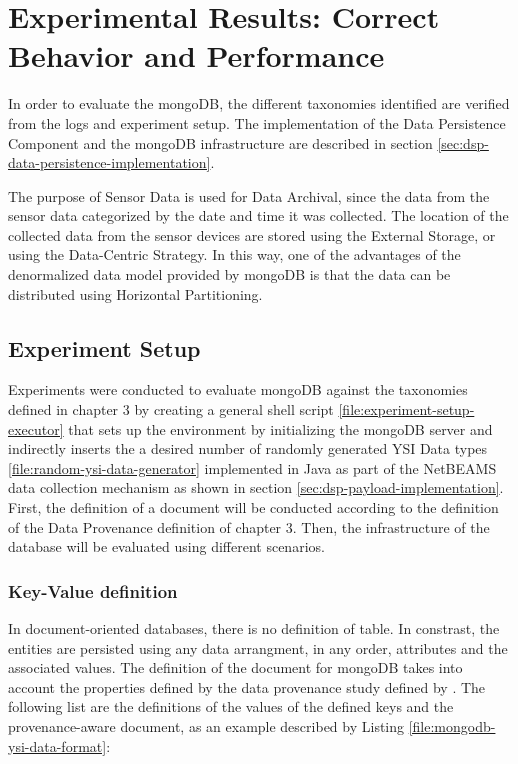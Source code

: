 

\chapter{Experimental Results: Correct Behavior and Performance}

In order to evaluate the mongoDB, the different taxonomies identified are
verified from the logs and experiment setup. The implementation of the Data
Persistence Component and the mongoDB infrastructure are described in section
\ref{sec:dsp-data-persistence-implementation}.

The purpose of Sensor Data is used for Data Archival, since the data from the
sensor data categorized by the date and time it was collected. The location
of the collected data from the sensor devices are stored using the External
Storage, or using the Data-Centric Strategy. In this way, one of the advantages
of the denormalized data model provided by mongoDB is that the data can be
distributed using Horizontal Partitioning.

\section{Experiment Setup}

Experiments were conducted to evaluate mongoDB against the taxonomies defined in
chapter 3 by creating a general shell script
\ref{file:experiment-setup-executor} that sets up the environment by
initializing the mongoDB server and indirectly inserts the a desired number of
randomly generated YSI Data types \ref{file:random-ysi-data-generator}
implemented in Java as part of the NetBEAMS data collection mechanism as shown
in section \ref{sec:dsp-payload-implementation}. First, the definition of a 
document will be conducted according to the definition of the Data Provenance
definition of chapter 3. Then, the infrastructure of the database will be
evaluated using different scenarios.

\subsection{Key-Value definition}

In document-oriented databases, there is no definition of table. In constrast,
the entities are persisted using any data arrangment, in any order, attributes
and the associated values. The definition of the document for mongoDB takes
into account the properties defined by the data provenance study defined by
\cite{sn-provenance}. The following list are the definitions of the values of
the defined keys and the provenance-aware document, as an example described by
Listing \ref{file:mongodb-ysi-data-format}:

